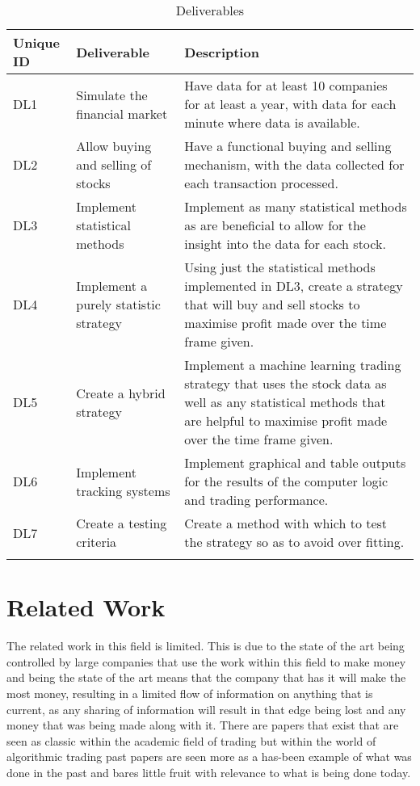 \documentclass[12pt,a4paper]{article}
\begin{document}
\label{units}
\begin{longtable}{ |p{1.5cm}|p{5.5cm}|p{8cm}| }\hline\hline
Unique ID & Deliverable & Description \\ \hline
DL1 & Simulate the financial market & Have data for at least 10 companies for at least a year, with data for each minute where data is available. \\ \hline
DL2 & Allow buying and selling of stocks & Have a functional buying and selling mechanism, with the data collected for each transaction processed. \\ \hline
DL3 & Implement statistical methods & Implement as many statistical methods as are beneficial to allow for the insight into the data for each stock. \\ \hline
DL4 & Implement a purely statistic strategy & Using just the statistical methods implemented in DL3, create a strategy that will buy and sell stocks to maximise profit made over the time frame given. \\ \hline
DL5 & Create a hybrid strategy & Implement a machine learning trading strategy that uses the stock data as well as any statistical methods that are helpful to maximise profit made over the time frame given. \\ \hline
DL6 & Implement tracking systems & Implement graphical and table outputs for the results of the computer logic and trading performance. \\ \hline
DL7 & Create a testing criteria & Create a method with which to test the strategy so as to avoid over fitting. \\ \hline
\caption{Deliverables}
\end{longtable}

\iffalse
#################################################################################
\fi

\section{Related Work}

\iffalse
This section presents a survey of existing work on the problems that this project addresses.  it should be between 2 to 4 pages in length.  The rest of this section shows the formats of subsections as well as some general formatting information for tables, figures, references and equations.
\fi

The related work in this field is limited. This is due to the state of the art being controlled by large companies that use the work within this field to make money and being the state of the art means that the company that has it will make the most money, resulting in a limited flow of information on anything that is current, as any sharing of information will result in that edge being lost and any money that was being made along with it. There are papers that exist that are seen as classic within the academic field of trading but within the world of algorithmic trading past papers are seen more as a has-been example of what was done in the past and bares little fruit with relevance to what is being done today. \\
\end{document}
